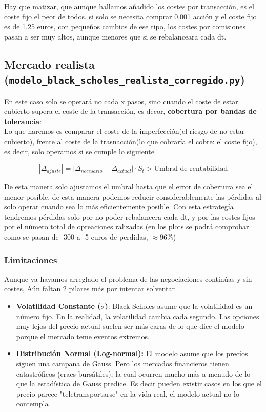 \documentclass[11pt]{article}
\newcommand{\comillas}[1]{"#1"} %
\newcommand{\mult}[0]{\!\cdot\!} %
\begin{document}
				Hay que matizar, que aunque hallamos añadido los costes por transacción, es el coste fijo el peor de todos, si solo se necesita comprar 0.001 acción y el coste fijo es de 1.25 euros, con pequeños cambios de ese tipo, los costes por comisiones pasan a ser muy altos, aunque menores que si se rebalanceara cada dt.
			
			\subsection{Mercado realista (\texttt{modelo\_black\_scholes\_realista\_corregido.py})}
				En este caso solo se operará no cada x pasos, sino cuando el coste de estar cubierto supera el coste de la transacción, es decor, \textbf{cobertura por bandas de tolerancia}:\\
				
				Lo que haremos es comparar el coste de la imperfección(el riesgo de no estar cubierto), frente al coste de la trasnacción(lo que cobraría el cobre: el coste fijo), es decir, solo operamos si se cumple lo siguiente
				
				\begin{equation}
					|\Delta_{ajuste}| = |\Delta_{necesario} - \Delta_{actual}| \mult S_t > \text{Umbral de rentabilidad}
				\end{equation}
				
				De esta manera solo ajustamos el umbral hasta que el error de cobertura sea el menor posible, de esta manera podemos reducir considerablemente las pérdidas al solo operar cuando sea lo más eficientemente posible. Con esta estrategía tendremos pérdidas solo por no poder rebalancera cada dt, y por las costes fijos por el número total de opreaciones ralizadas (en los plots se podrá comprobar como se pasan de -300 a -5 euros de perdidas, $\approx 96\%$)
				
				\subsubsection{Limitaciones}
				Aunque ya hayamos arreglado el problema de las negociaciones continúas y sin costes, Aún faltan 2 pilares más por intentar solventar
				
				\begin{itemize}
					\item \textbf{Volatilidad Constante ($\sigma$)}: Black-Scholes asume que la volatilidad es un número fijo. En la realidad, la volatilidad cambia cada segundo. Las opciones muy lejos del precio actual suelen ser más caras de lo que dice el modelo porque el mercado teme eventos extremos.
					
					\item \textbf{Distribución Normal (Log-normal):} El modelo asume que los precios siguen una campana de Gauss. Pero los mercados financieros tienen catastróficos (cracs bursátiles), la cual ocurren mucho más a menudo de lo que la estadística de Gauss predice. Es decir pueden existir casos en los que el precio parece \comillas{teletransportarse} en la vida real, el modelo actual no lo contempla\\
				\end{itemize}
				
\end{document}
